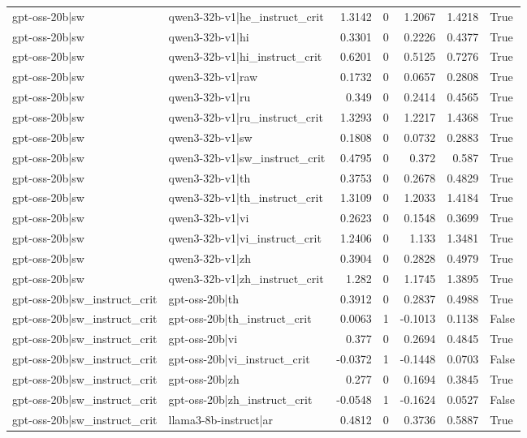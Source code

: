 \begin{table}
\begin{tabular}{l l r r r r l}
gpt-oss-20b|sw & qwen3-32b-v1|he_instruct_crit & 1.3142 & 0 & 1.2067 & 1.4218 & True \\
gpt-oss-20b|sw & qwen3-32b-v1|hi & 0.3301 & 0 & 0.2226 & 0.4377 & True \\
gpt-oss-20b|sw & qwen3-32b-v1|hi_instruct_crit & 0.6201 & 0 & 0.5125 & 0.7276 & True \\
gpt-oss-20b|sw & qwen3-32b-v1|raw & 0.1732 & 0 & 0.0657 & 0.2808 & True \\
gpt-oss-20b|sw & qwen3-32b-v1|ru & 0.349 & 0 & 0.2414 & 0.4565 & True \\
gpt-oss-20b|sw & qwen3-32b-v1|ru_instruct_crit & 1.3293 & 0 & 1.2217 & 1.4368 & True \\
gpt-oss-20b|sw & qwen3-32b-v1|sw & 0.1808 & 0 & 0.0732 & 0.2883 & True \\
gpt-oss-20b|sw & qwen3-32b-v1|sw_instruct_crit & 0.4795 & 0 & 0.372 & 0.587 & True \\
gpt-oss-20b|sw & qwen3-32b-v1|th & 0.3753 & 0 & 0.2678 & 0.4829 & True \\
gpt-oss-20b|sw & qwen3-32b-v1|th_instruct_crit & 1.3109 & 0 & 1.2033 & 1.4184 & True \\
gpt-oss-20b|sw & qwen3-32b-v1|vi & 0.2623 & 0 & 0.1548 & 0.3699 & True \\
gpt-oss-20b|sw & qwen3-32b-v1|vi_instruct_crit & 1.2406 & 0 & 1.133 & 1.3481 & True \\
gpt-oss-20b|sw & qwen3-32b-v1|zh & 0.3904 & 0 & 0.2828 & 0.4979 & True \\
gpt-oss-20b|sw & qwen3-32b-v1|zh_instruct_crit & 1.282 & 0 & 1.1745 & 1.3895 & True \\
gpt-oss-20b|sw_instruct_crit & gpt-oss-20b|th & 0.3912 & 0 & 0.2837 & 0.4988 & True \\
gpt-oss-20b|sw_instruct_crit & gpt-oss-20b|th_instruct_crit & 0.0063 & 1 & -0.1013 & 0.1138 & False \\
gpt-oss-20b|sw_instruct_crit & gpt-oss-20b|vi & 0.377 & 0 & 0.2694 & 0.4845 & True \\
gpt-oss-20b|sw_instruct_crit & gpt-oss-20b|vi_instruct_crit & -0.0372 & 1 & -0.1448 & 0.0703 & False \\
gpt-oss-20b|sw_instruct_crit & gpt-oss-20b|zh & 0.277 & 0 & 0.1694 & 0.3845 & True \\
gpt-oss-20b|sw_instruct_crit & gpt-oss-20b|zh_instruct_crit & -0.0548 & 1 & -0.1624 & 0.0527 & False \\
gpt-oss-20b|sw_instruct_crit & llama3-8b-instruct|ar & 0.4812 & 0 & 0.3736 & 0.5887 & True \\

\end{tabular}
\end{table}
